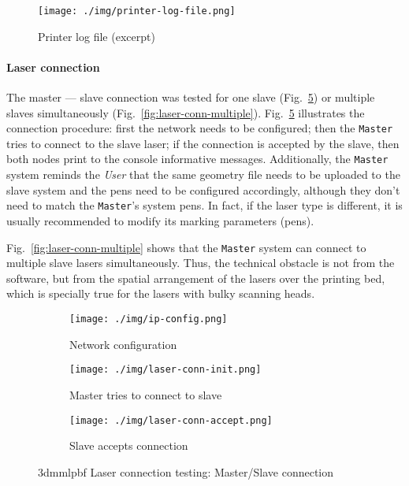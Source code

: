 \begin{figure}[!hbt]
  \centering
    \texttt{[image: ./img/printer-log-file.png]}
  \caption{Printer log file (excerpt)}%
\label{fig:printer-log-file}
\end{figure}

\paragraph{Laser connection}
The master --- slave connection was tested for one slave
(Fig.~\ref{fig:laser-conn-init}) or multiple slaves simultaneously
(Fig.~\ref{fig:laser-conn-multiple}). Fig.~\ref{fig:laser-conn-init} illustrates
the connection procedure: first the network needs to be configured; then the
\texttt{Master} tries to connect to the slave laser; if the connection is
accepted by the slave, then both nodes print to the console informative
messages. Additionally, the \texttt{Master} system reminds the \emph{User} that
the same geometry file needs to be uploaded to the slave system and the pens
need to be configured accordingly, although they don't need to match the
\texttt{Master}'s system pens. In fact, if the laser type is different, it is
usually recommended to modify its marking parameters (pens).

Fig.~\ref{fig:laser-conn-multiple} shows that the \texttt{Master} system can
connect to multiple slave lasers simultaneously. Thus, the technical obstacle is
not from the software, but from the spatial arrangement of the lasers over the
printing bed, which is specially true for the lasers with bulky scanning heads.

\begin{figure}[htb!]
  \centering
  \begin{subfigure}[t]{0.6\textwidth}
    \texttt{[image: ./img/ip-config.png]}
  \caption{Network configuration}%
  \label{fig:laser-conn-init-1}
  \end{subfigure}
%
  \begin{subfigure}[t]{0.9\textwidth}
    \texttt{[image: ./img/laser-conn-init.png]}
  \caption{Master tries to connect to slave}%
  \label{fig:laser-conn-init-2}
  \end{subfigure}
%
  \begin{subfigure}[t]{0.9\textwidth}
    \texttt{[image: ./img/laser-conn-accept.png]}
  \caption{Slave accepts connection}%
  \label{fig:laser-conn-init-3}
  \end{subfigure}
  \caption{\gls{3dmmlpbf} Laser connection testing: Master/Slave connection}%
  \label{fig:laser-conn-init}
\end{figure}

